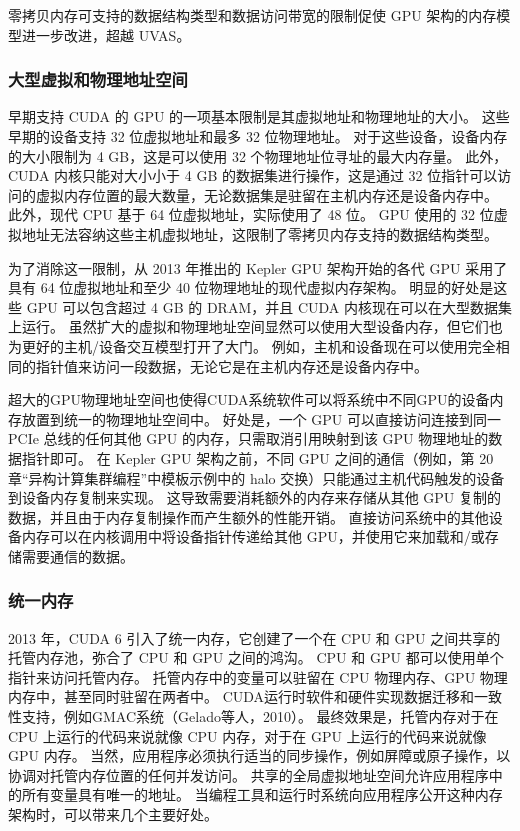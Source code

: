 零拷贝内存可支持的数据结构类型和数据访问带宽的限制促使 GPU 架构的内存模型进一步改进，超越 UVAS。

\subsubsection{大型虚拟和物理地址空间}
早期支持 CUDA 的 GPU 的一项基本限制是其虚拟地址和物理地址的大小。 这些早期的设备支持 32 位虚拟地址和最多 32 位物理地址。 对于这些设备，设备内存的大小限制为 4 GB，这是可以使用 32 个物理地址位寻址的最大内存量。 此外，CUDA 内核只能对大小小于 4 GB 的数据集进行操作，这是通过 32 位指针可以访问的虚拟内存位置的最大数量，无论数据集是驻留在主机内存还是设备内存中。 此外，现代 CPU 基于 64 位虚拟地址，实际使用了 48 位。 GPU 使用的 32 位虚拟地址无法容纳这些主机虚拟地址，这限制了零拷贝内存支持的数据结构类型。

为了消除这一限制，从 2013 年推出的 Kepler GPU 架构开始的各代 GPU 采用了具有 64 位虚拟地址和至少 40 位物理地址的现代虚拟内存架构。 明显的好处是这些 GPU 可以包含超过 4 GB 的 DRAM，并且 CUDA 内核现在可以在大型数据集上运行。 虽然扩大的虚拟和物理地址空间显然可以使用大型设备内存，但它们也为更好的主机/设备交互模型打开了大门。 例如，主机和设备现在可以使用完全相同的指针值来访问一段数据，无论它是在主机内存还是设备内存中。

超大的GPU物理地址空间也使得CUDA系统软件可以将系统中不同GPU的设备内存放置到统一的物理地址空间中。 好处是，一个 GPU 可以直接访问连接到同一 PCIe 总线的任何其他 GPU 的内存，只需取消引用映射到该 GPU 物理地址的数据指针即可。 在 Kepler GPU 架构之前，不同 GPU 之间的通信（例如，第 20 章“异构计算集群编程”中模板示例中的 halo 交换）只能通过主机代码触发的设备到设备内存复制来实现。 这导致需要消耗额外的内存来存储从其他 GPU 复制的数据，并且由于内存复制操作而产生额外的性能开销。 直接访问系统中的其他设备内存可以在内核调用中将设备指针传递给其他 GPU，并使用它来加载和/或存储需要通信的数据。

\subsubsection{统一内存}
2013 年，CUDA 6 引入了统一内存，它创建了一个在 CPU 和 GPU 之间共享的托管内存池，弥合了 CPU 和 GPU 之间的鸿沟。 CPU 和 GPU 都可以使用单个指针来访问托管内存。 托管内存中的变量可以驻留在 CPU 物理内存、GPU 物理内存中，甚至同时驻留在两者中。 CUDA运行时软件和硬件实现数据迁移和一致性支持，例如GMAC系统（Gelado等人，2010）。 最终效果是，托管内存对于在 CPU 上运行的代码来说就像 CPU 内存，对于在 GPU 上运行的代码来说就像 GPU 内存。 当然，应用程序必须执行适当的同步操作，例如屏障或原子操作，以协调对托管内存位置的任何并发访问。 共享的全局虚拟地址空间允许应用程序中的所有变量具有唯一的地址。 当编程工具和运行时系统向应用程序公开这种内存架构时，可以带来几个主要好处。

